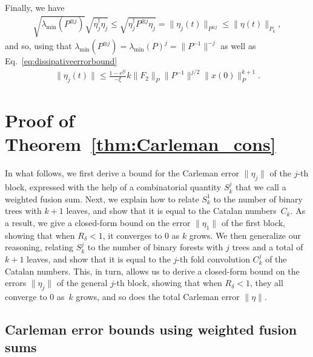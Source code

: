 \documentclass[superscriptaddress,onecolumn,nofootinbib,longbibliography,a4paper,accepted=2026-09-29]{quantumarticle}
\theoremstyle{plain}
\theoremstyle{definition}
\numberwithin{thm}{section}
\numberwithin{assumption}{section}
\numberwithin{lemma}{section}
\numberwithin{prop}{section}
\numberwithin{cor}{section}
\numberwithin{definition}{section}
\numberwithin{rmk}{section}
\numberwithin{equation}{section}
\begin{document}
Finally, we have
\begin{align}
\sqrt{\lambda_{\mathrm{min}} (P^{\otimes j}) }\sqrt{\eta_j^\dag \eta_j} \leq  \sqrt{\eta_j^\dag P^{\otimes j} \eta_j} = \| \eta_j(t)\|_{P^{\otimes j}} \leq \| \eta(t)\|_{P_{k}},
\end{align}
and so, using that $\lambda_{\mathrm{min}} (P^{\otimes j}) = \lambda_{\mathrm{min}}(P)^j = \|P^{-1}\|^{-j}$ as well as Eq.~\eqref{eq:dissipativeerrorbound}
\begin{align}
  \|\eta_j(t)\|  \leq \frac{1- e^{ \xi t}}{-\xi } k \|F_2\|_P \| P^{-1}\|^{j/2} \| x(0)\|_P^{k+1}.
\end{align}



\section{Proof of Theorem~\ref{thm:Carleman_cons}}
\label{app:thm_cons}

In what follows, we first derive a bound for the Carleman error $\|\eta_j\|$ of the $j$-th block, expressed with the help of a combinatorial quantity $S_k^{j}$ that we call a weighted fusion sum. Next, we explain how to relate $S_k^{1}$ to the number of binary trees with $k+1$ leaves, and show that it is equal to the Catalan numbers~$C_k$. As a result, we give a closed-form bound on the error $\|\eta_1\|$ of the first block, showing that when $R_\delta<1$, it converges to 0 as $k$ grows. We then generalize our reasoning, relating $S_k^{j}$ to the number of binary forests with $j$ trees and a total of $k+1$ leaves, and show that it is equal to the $j$-th fold convolution $C^{j}_k$ of the Catalan numbers. This, in turn, allows us to derive a closed-form bound on the errors $\|\eta_j\|$ of the general $j$-th block, showing that when $R_\delta<1$, they all converge to 0 as~$k$ grows, and so does the total Carleman error $\|\eta\|$.


\subsection{Carleman error bounds using weighted fusion sums}
\end{document}
